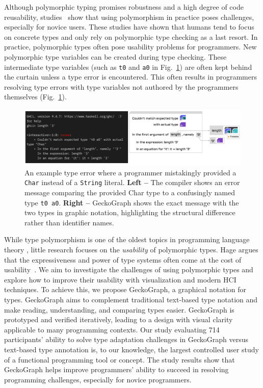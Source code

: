 Although polymorphic typing promises robustness and a high degree of code reusability, studies~\cite{Jun2000-ec, Jun2000-yu} show that using polymorphism in practice poses challenges, especially for novice users. These studies have shown that humans tend to focus on concrete types and only rely on polymorphic type checking as a last resort. In practice, polymorphic types often pose usability problems for programmers. New polymorphic type variables can be created during type checking. These intermediate type variables (such as \texttt{t0} and \texttt{a0} in Fig.~\ref{fig:example-foldable}) are often kept behind the curtain unless a type error is encountered. This often results in programmers resolving type errors with type variables not authored by the programmers themselves (Fig.~\ref{fig:example-foldable}).


\begin{figure}[hbt]
  \includegraphics[width=\linewidth]{figures/Foldable}
  \caption[Comparison between GeckoGraph and compiler error message]{\label{fig:example-foldable} An example type error where a programmer mistakingly provided a \texttt{Char} instead of a \texttt{String} literal. \textbf{Left --} The compiler shows an error message comparing the provided Char type to a confusingly named type \texttt{t0 a0}. \textbf{Right --} GeckoGraph shows the exact message with the two types in graphic notation, highlighting the structural difference rather than identifier names.}
\end{figure}


While type polymorphism is one of the oldest topics in programming language theory \cite{Cardelli1987-fp}, little research focuses on the \textit{usability} of polymorphic types. Hage argues that the expressiveness and power of type systems often come at the cost of usability~\cite{Hage2020-hg}. We aim to investigate the challenges of using polymorphic types and explore how to improve their usability with visualization and modern HCI techniques. To achieve this, we propose GeckoGraph, a graphical notation for types. GeckoGraph aims to complement traditional text-based type notation and make reading, understanding, and comparing types easier. GeckoGraph is prototyped and verified iteratively, leading to a design with visual clarity applicable to many programming contexts. Our study evaluating 714 participants' ability to solve type adaptation challenges in GeckoGraph versus text-based type annotation is, to our knowledge, the largest controlled user study of a functional programming tool or concept. The study results show that GeckoGraph helps improve programmers' ability to succeed in resolving programming challenges, especially for novice programmers.


